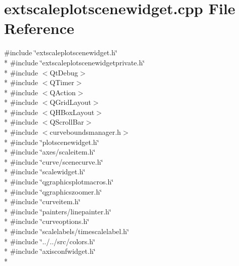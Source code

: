 \section{extscaleplotscenewidget.\+cpp File Reference}
\label{bk3_2extscaleplotscenewidget_2extscaleplotscenewidget_8cpp}
{\ttfamily \#include \char`\"{}extscaleplotscenewidget.\+h\char`\"{}}\\*
{\ttfamily \#include \char`\"{}extscaleplotscenewidgetprivate.\+h\char`\"{}}\\*
{\ttfamily \#include $<$Qt\+Debug$>$}\\*
{\ttfamily \#include $<$Q\+Timer$>$}\\*
{\ttfamily \#include $<$Q\+Action$>$}\\*
{\ttfamily \#include $<$Q\+Grid\+Layout$>$}\\*
{\ttfamily \#include $<$Q\+H\+Box\+Layout$>$}\\*
{\ttfamily \#include $<$Q\+Scroll\+Bar$>$}\\*
{\ttfamily \#include $<$curveboundsmanager.\+h$>$}\\*
{\ttfamily \#include \char`\"{}plotscenewidget.\+h\char`\"{}}\\*
{\ttfamily \#include \char`\"{}axes/scaleitem.\+h\char`\"{}}\\*
{\ttfamily \#include \char`\"{}curve/scenecurve.\+h\char`\"{}}\\*
{\ttfamily \#include \char`\"{}scalewidget.\+h\char`\"{}}\\*
{\ttfamily \#include \char`\"{}qgraphicsplotmacros.\+h\char`\"{}}\\*
{\ttfamily \#include \char`\"{}qgraphicszoomer.\+h\char`\"{}}\\*
{\ttfamily \#include \char`\"{}curveitem.\+h\char`\"{}}\\*
{\ttfamily \#include \char`\"{}painters/linepainter.\+h\char`\"{}}\\*
{\ttfamily \#include \char`\"{}curveoptions.\+h\char`\"{}}\\*
{\ttfamily \#include \char`\"{}scalelabels/timescalelabel.\+h\char`\"{}}\\*
{\ttfamily \#include \char`\"{}../../src/colors.\+h\char`\"{}}\\*
{\ttfamily \#include \char`\"{}axisconfwidget.\+h\char`\"{}}\\*
